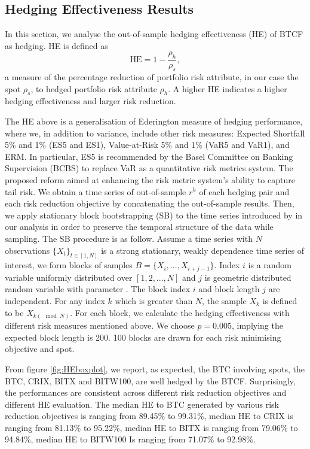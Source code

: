 






\subsection{Hedging Effectiveness Results}\label{sec: HE results}
In this section, we analyse the out-of-sample hedging effectiveness (HE) of BTCF as hedging.
HE is defined as $$\text{HE} = 1-\frac{\rho_h}{\rho_s},$$
a measure of the percentage reduction of portfolio risk attribute, in our case the spot $\rho_s$,
to hedged portfolio risk attribute $\rho_h$.
A higher HE indicates a higher hedging effectiveness and larger risk reduction. \medskip

The HE above is a generalisation of Ederington measure of hedging performance, where we,
in addition to variance, include other risk measures: Expected Shortfall 5\% and 1\% (ES5 and ES1), Value-at-Risk 5\% and 1\% (VaR5 and VaR1), and ERM.
In particular, ES5 is recommended by the Basel Committee on Banking Supervision (BCBS) to replace VaR as a quantitative risk metrics system.
The proposed reform aimed at enhancing the risk metric system's ability to capture tail risk. \medskip
%
We obtain a time series of out-of-sample $r^h$ of each hedging pair and each risk reduction objective by concatenating the out-of-sample results.
Then, we apply stationary block bootstrapping (SB) to the time series introduced by \cite{Politis1994} in our analysis in order to preserve the temporal structure of the data while sampling.
The SB procedure is as follow.
Assume a time series with $N$ observations $\{X_t\}_{t \in [1,N]}$ is a strong stationary, weakly dependence time series of interest,
we form blocks of samples $B = \{X_i, ..., X_{i+j-1}\}$.
Index $i$ is a random variable uniformly distributed over $[1,2,...,N]$ and $j$ is geometric distributed random variable with parameter .
The block index $i$ and block length $j$ are independent.
For any index $k$ which is greater than $N$, the sample $X_k$ is defined to be $X_{k(\mod N)}$.
For each block, we calculate the hedging effectiveness with different risk measures mentioned above.
We choose $p=0.005$, implying the expected block length is 200.
100 blocks are drawn for each risk minimising objective and spot. \medskip

From figure \ref{fig:HEboxplot}, we report, as expected, the BTC involving spots, the BTC, CRIX, BITX and BITW100, are well hedged by the BTCF.
Surprisingly, the performances are consistent across different risk reduction objectives and different HE evaluation.
The median HE to BTC generated by various risk reduction objectives is ranging from 89.45\% to 99.31\%, median HE to CRIX is ranging from 81.13\% to 95.22\%,
median HE to BITX is ranging from 79.06\% to 94.84\%, median HE to BITW100 Is ranging from 71.07\% to 92.98\%. \medskip

